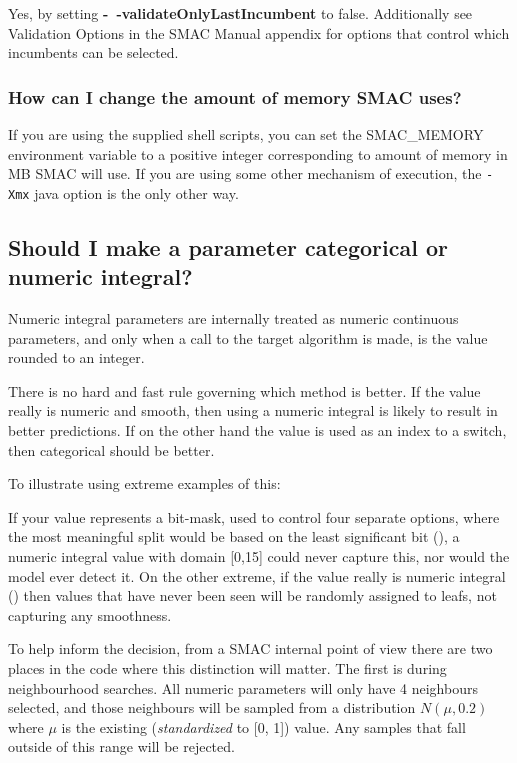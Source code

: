 \documentclass[11pt,letterpaper,oneside]{article}
\begin{document}
	Yes, by setting \textbf{-~$\!$-validateOnlyLastIncumbent} to false. Additionally see {Validation Options} in the SMAC Manual appendix for options that control which incumbents can be selected.


\subsubsection{How can I change the amount of memory SMAC uses?}

If you are using the supplied shell scripts, you can set the SMAC\_MEMORY environment variable to a positive integer corresponding to amount of memory in MB SMAC will use. If you are using some other mechanism of execution, the \texttt{-Xmx} java option is the only other way.


\subsection{Should I make a parameter categorical or numeric integral?}

	Numeric integral parameters are internally treated as numeric continuous parameters, and only when a call to the target algorithm is made, is the value rounded to an integer. 
	
	There is no hard and fast rule governing which method is better. If the value really is numeric and smooth, then using a numeric integral is likely to result in better predictions. If on the other hand the value is used as an index to a switch, then categorical should be better.
	
	To illustrate using extreme examples of this:
	
	If your value represents a bit-mask, used to control four separate options, where the most meaningful split would be based on the least significant bit (), a numeric integral value with domain [0,15] could never capture this, nor would the model ever detect it. On the other extreme, if the value really is numeric integral (\eg{[0, 1024]}) then values that have never been seen will be randomly assigned to leafs, not capturing any smoothness.
		
	
	To help inform the decision, from a SMAC internal point of view there are two places in the code where this distinction will matter. The first is during neighbourhood searches. All numeric parameters will only have 4 neighbours selected, and those neighbours will be sampled from a distribution $N(\mu, 0.2)$ where $\mu$ is the existing (\emph{standardized} to [0, 1]) value. Any samples that fall outside of this range will be rejected.
	
\end{document}
